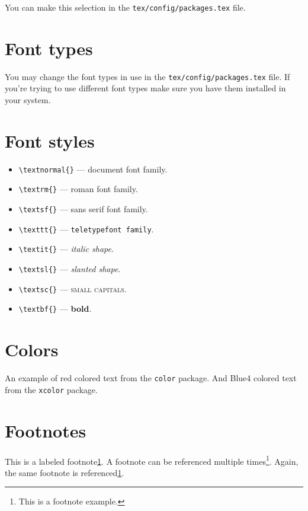 You can make this selection in the \verb+tex/config/packages.tex+ file.


\section{Font types}
\label{c2:s:font-types}

You may change the font types in use in the \verb+tex/config/packages.tex+ file.
If you're trying to use different font types make sure you have them installed in your system.


\section{Font styles}
\label{c2:s:font-styles}

\begin{itemize}
\item
\verb+\textnormal{}+ --- \textnormal{document font family}.
\item
\verb+\textrm{}+ --- \textrm{roman font family}.
\item
\verb+\textsf{}+ --- \textsf{sans serif font family}.
\item
\verb+\texttt{}+ --- \texttt{teletypefont family}.
\item
\verb+\textit{}+ --- \textit{italic shape}.
\item
\verb+\textsl{}+ --- \textsl{slanted shape}.
\item
\verb+\textsc{}+ --- \textsc{small capitals}.
\item
\verb+\textbf{}+ --- \textbf{bold}.
\end{itemize}


\section{Colors}
\label{c2:s:colors}

An example of {\color{red} red colored text} from the \texttt{color} package.
And {\color{Blue4} Blue4 colored text} from the \texttt{xcolor} package.

\section{Footnotes}
\label{c2:s:footnotes}

This is a labeled footnote\cref{foot:example}.
A footnote can be referenced multiple times\footnote{\label{foot:example}This is a footnote example.}.
Again, the same footnote is referenced\cref{foot:example}.


